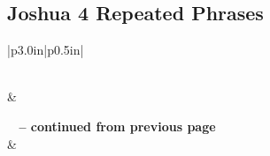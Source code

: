 \subsection{Joshua 4 Repeated Phrases}


\normalsize
 
\begin{center}
\begin{longtable}{|p{3.0in}|p{0.5in}|}
\caption[Joshua 4 Repeated Phrases]{Joshua 4 Repeated Phrases}\label{table:Repeated Phrases Joshua 4} \\
\hline {} &  \\ \hline 
\endfirsthead
 
{{\bfseries \tablename\ \thetable{} -- continued from previous page}} \\  
\hline {} &  \\ \hline 
\endhead
 

\end{longtable}
\end{center}
